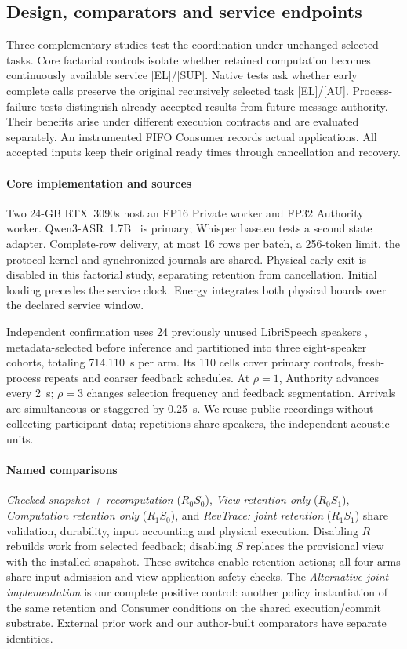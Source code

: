 \subsection{Design, comparators and service endpoints}
Three complementary studies test the coordination under unchanged
selected tasks. Core factorial controls isolate whether retained
computation becomes continuously available service [EL]/[SUP]. Native
tests ask whether early complete calls preserve the original recursively
selected task [EL]/[AU]. Process-failure tests distinguish already
accepted results from future message authority. Their benefits arise
under different execution contracts and are evaluated separately.
An instrumented FIFO Consumer records actual applications. All accepted
inputs keep their original ready times through cancellation and recovery.

\paragraph{Core implementation and sources}
Two 24-GB RTX~3090s host an FP16 Private worker and FP32 Authority worker.
Qwen3-ASR~1.7B~\cite{shi2026qwen3asr} is primary; Whisper base.en
\cite{radford2023whisper} tests a second state adapter. Complete-row
delivery, at most 16 rows per batch, a 256-token limit, the protocol kernel
and synchronized journals are shared. Physical early exit is disabled
in this factorial study, separating retention from cancellation.
Initial loading precedes the service clock. Energy integrates both
physical boards over the declared service window.

Independent confirmation uses 24 previously unused LibriSpeech speakers
\cite{panayotov2015librispeech}, metadata-selected before inference and
partitioned into three eight-speaker cohorts, totaling 714.110~s per arm.
Its 110 cells cover primary controls, fresh-process repeats and coarser
feedback schedules. At $\rho=1$, Authority advances every 2~s;
$\rho=3$ changes selection frequency and feedback segmentation. Arrivals
are simultaneous or staggered by 0.25~s. We reuse public recordings without
collecting participant data; repetitions share speakers, the independent
acoustic units.

\paragraph{Named comparisons}
\emph{Checked snapshot + recomputation} ($R_0S_0$), \emph{View retention
only} ($R_0S_1$), \emph{Computation retention only} ($R_1S_0$), and
\emph{RevTrace: joint retention} ($R_1S_1$) share validation, durability,
input accounting and physical execution. Disabling $R$ rebuilds work
from selected feedback; disabling $S$ replaces the provisional view
with the installed snapshot. These switches enable retention actions;
all four arms share input-admission and view-application safety checks.
The \emph{Alternative joint implementation} is our complete positive
control: another policy instantiation of the same retention and Consumer
conditions on the shared execution/commit substrate. External prior work
and our author-built comparators have separate identities.

